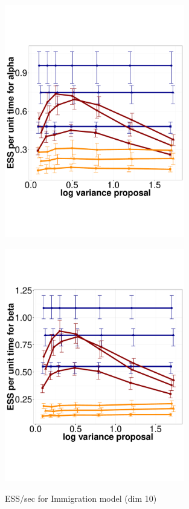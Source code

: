   \begin{figure}%
  \centering
  \begin{minipage}[!hp]{0.45\linewidth}
  \centering
    \includegraphics [width=0.70\textwidth, angle=0]{figs/q_10_alpha.pdf}
      \end{minipage}
  \begin{minipage}[!hp]{0.45\linewidth}
  \centering
    \includegraphics [width=0.70\textwidth, angle=0]{figs/q_10_beta.pdf}
    \vspace{-0 in}
     \label{fig:ESS_Q_10}
  \end{minipage}
    \caption{ESS/sec for Immigration model (dim 10)}
  \end{figure}

